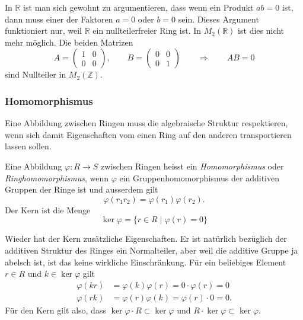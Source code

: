 In $\mathbb{R}$ ist man sich gewohnt zu argumentieren, dass wenn ein
Produkt $ab=0$ ist, dann muss einer der Faktoren $a=0$ oder $b=0$ sein.
Dieses Argument funktioniert nur, weil $\mathbb{R}$ ein nullteilerfreier
Ring ist.
In $M_2(\mathbb{R})$ ist dies nicht mehr möglich.
Die beiden Matrizen
\[
A=\begin{pmatrix}
1&0\\0&0
\end{pmatrix}
,\qquad
B=\begin{pmatrix}
0&0\\0&1
\end{pmatrix}
\qquad\Rightarrow\qquad
AB=0
\]
sind Nullteiler in $M_2(\mathbb{Z})$.

\subsubsection{Homomorphismus}
Eine Abbildung zwischen Ringen muss die algebraische Struktur respektieren,
wenn sich damit Eigenschaften vom einen Ring auf den anderen transportieren
lassen sollen.

\begin{definition}
Eine Abbildung $\varphi:R \to S$ zwischen Ringen heisst ein
{\em Homomorphismus}
%
oder {\em Ringhomomorphismus},
%
wenn $\varphi$ ein Gruppenhomomorphismus der additiven Gruppen der Ringe
ist und ausserdem gilt
\[
\varphi(r_1r_2) = \varphi(r_1)\varphi(r_2).
\]
Der Kern ist die Menge
\[
\ker\varphi = \{ r\in R\;|\; \varphi(r)=0\}
\]
%
\end{definition}

Wieder hat der Kern zusätzliche Eigenschaften.
Er ist natürlich bezüglich der additiven Struktur des Ringes ein
Normalteiler, aber weil die additive Gruppe ja abelsch ist, ist das
keine wirkliche Einschränkung.
Für ein beliebiges Element $r\in R$ und $k\in \ker\varphi$ gilt
\begin{align*}
\varphi(kr) &= \varphi(k)\varphi(r) = 0\cdot\varphi(r) = 0
\\
\varphi(rk) &= \varphi(r)\varphi(k) = \varphi(r)\cdot 0 = 0.
\end{align*}
Für den Kern gilt also, dass $\ker\varphi\cdot R\subset \ker\varphi$
und $R\cdot\ker\varphi\subset\ker\varphi$.

